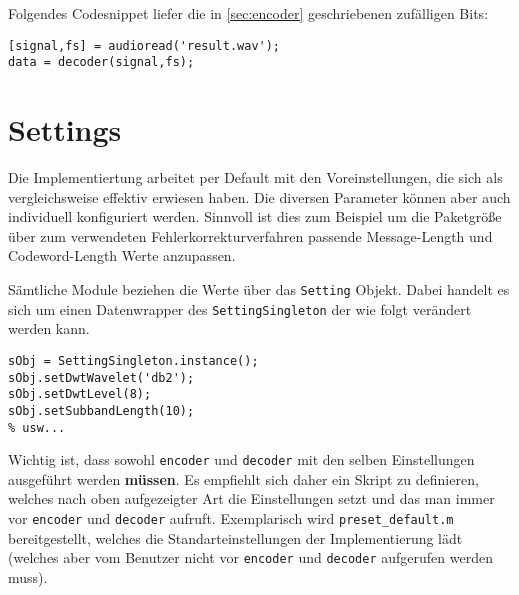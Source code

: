 Folgendes Codesnippet liefer die in \ref{sec:encoder} geschriebenen zufälligen Bits:

\begin{verbatim}
[signal,fs] = audioread('result.wav');
data = decoder(signal,fs);
\end{verbatim}


\section{Settings}

Die Implementiertung arbeitet per Default mit den Voreinstellungen, die sich als vergleichsweise effektiv erwiesen haben. Die diversen Parameter können aber auch individuell konfiguriert werden. Sinnvoll ist dies zum Beispiel um die Paketgröße über zum verwendeten Fehlerkorrekturverfahren passende Message-Length und Codeword-Length Werte anzupassen.

Sämtliche Module beziehen die Werte über das \texttt{Setting} Objekt. Dabei handelt es sich um einen Datenwrapper des \texttt{SettingSingleton} der wie folgt verändert werden kann. 

\begin{verbatim}
sObj = SettingSingleton.instance();
sObj.setDwtWavelet('db2');
sObj.setDwtLevel(8);
sObj.setSubbandLength(10);
% usw...
\end{verbatim}

Wichtig ist, dass sowohl \texttt{encoder} und \texttt{decoder} mit den selben Einstellungen ausgeführt werden \textbf{müssen}. Es empfiehlt sich daher ein Skript zu definieren, welches nach oben aufgezeigter Art die Einstellungen setzt und das man immer vor \texttt{encoder} und \texttt{decoder} aufruft. Exemplarisch wird \texttt{preset\_default.m} bereitgestellt, welches die Standarteinstellungen der Implementierung lädt (welches aber vom Benutzer nicht vor \texttt{encoder} und \texttt{decoder} aufgerufen werden muss).









